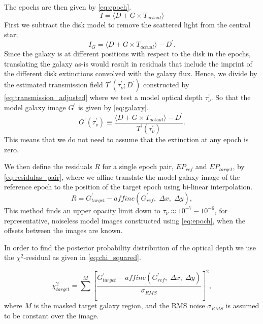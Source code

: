 \documentclass{aa}
\begin{document}
The epochs are then given by \autoref{eq:epoch}.
\begin{equation}
\label{eq:epoch}
    I = \langle D + G \times T_{actual} \rangle
\end{equation}
First we subtract the disk model to remove the scattered light from the central star;
\begin{equation}
\label{eq:epoch_no_disk}
    I_{G} = \langle D + G \times T_{actual} \rangle - D^{\prime}.
\end{equation}
Since the galaxy is at different positions with respect to the disk in the epochs, translating the galaxy as-is would result in residuals that include the imprint of the different disk extinctions convolved with the galaxy flux. Hence, we divide by the estimated transmission field $T^{\prime}(\tau_{\nu}^{\prime};D^{\prime})$ constructed by \autoref{eq:transmission_adjusted} where we test a model optical depth $\tau_{\nu}^{\prime}$. So that the model galaxy image $G^{\prime}$ is given by \autoref{eq:galaxy}.
\begin{equation}
\label{eq:galaxy}
   G^{\prime}(\tau_{\nu}^{\prime}) \equiv \frac{\langle D + G \times T_{actual} \rangle - D^{\prime}}{T^{\prime}(\tau_{\nu}^{\prime})}.
\end{equation}
This means that we do not need to assume that the extinction at any epoch is zero.

We then define the residuals $R$ for a single epoch pair, $EP_{ref}$ and $EP_{target}$, by \autoref{eq:residulas_pair}, where we affine translate the model galaxy image of the reference epoch to the position of the target epoch using bi-linear interpolation.
\begin{equation}
\label{eq:residulas_pair}
    R = G_{target}^{\prime} - affine \left( G_{ref}^{\prime}, \; \Delta x,\; \Delta y \right), 
\end{equation}
This method finds an upper opacity limit down to $\tau_{\nu} \approx 10^{-7}-10^{-6}$, for representative, noiseless model images constructed using \autoref{eq:epoch}, when the offsets between the images are known.

In order to find the posterior probability distribution of the optical depth we use the $\chi^{2}$-residual as given in \autoref{eq:chi_squared}.

\begin{equation}
\label{eq:chi_squared}
        \chi^{2}_{target} = \sum^{M} \left[ \frac{G_{target}^{\prime} - affine \left( G_{ref}^{\prime}, \; \Delta x,\; \Delta y \right)}{\sigma_{RMS}} \right]^{2},
\end{equation}
where $M$ is the masked target galaxy region, and the RMS noise $\sigma_{RMS}$ is assumed to be constant over the image.
\end{document}
